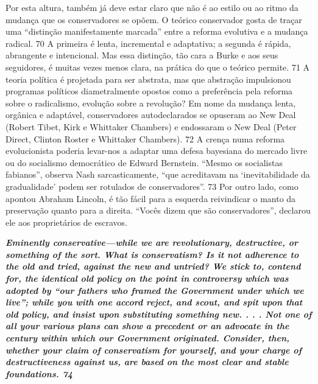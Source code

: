  
\par
 
Por esta altura, também já deve estar claro que não é ao estilo ou ao ritmo da mudança que os conservadores se opõem. O teórico conservador gosta de traçar uma “distinção manifestamente marcada” entre a reforma evolutiva e a mudança radical.
 {\color{blue} 70}  
A primeira é lenta, incremental e adaptativa; a segunda é rápida, abrangente e intencional. Mas essa distinção, tão cara a Burke e aos seus seguidores, é muitas vezes menos clara, na prática do que o teórico permite.
 {\color{blue} 71}  
A teoria política é projetada para ser abstrata, mas que abstração impulsionou programas políticos diametralmente opostos como a preferência pela reforma sobre o radicalismo, evolução sobre a revolução? Em nome da mudança lenta, orgânica e adaptável, conservadores autodeclarados se opuseram ao New Deal (Robert Tibet, Kirk e Whittaker Chambers) e endossaram o New Deal (Peter Direct, Clinton Roster e Whittaker Chambers).
 {\color{blue} 72}  
A crença numa reforma evolucionista poderia levar-nos a adaptar uma defesa bayesiana do mercado livre ou do socialismo democrático de Edward Bernstein. “Mesmo os socialistas fabianos”, observa Nash sarcasticamente, “que acreditavam na ‘inevitabilidade da gradualidade’ podem ser rotulados de conservadores”.
 {\color{blue} 73}  
Por outro lado, como apontou Abraham Lincoln, é tão fácil para a esquerda reivindicar o manto da preservação quanto para a direita. “Vocês dizem que são conservadores”, declarou ele aos proprietários de escravos.
 
\par
 

 \textbf{\textit{Eminently conservative—while we are revolutionary, destructive, or something of the sort. What is conservatism? Is it not adherence to the old and tried, against the new and untried? We stick to, contend for, the identical old policy on the point in controversy which was adopted by “our fathers who framed the Government under which we live”; while you with one accord reject, and scout, and spit upon that old policy, and insist upon substituting something new. . . . Not one of all your various plans can show a precedent or an advocate in the century within which our Government originated. Consider, then, whether your claim of conservatism for yourself, and your charge of destructiveness against us, are based on the most clear and stable foundations. {{\color{blue} 74} } } }  
 
 
\par
 
